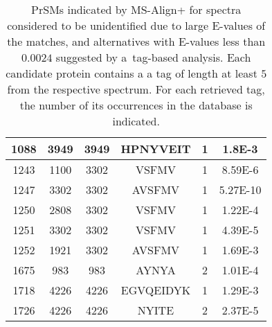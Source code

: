 \documentclass{article}[12pt]
\begin{document}
\begin{landscape}
\begin{table}[h]
{\begin{center}
\begin{tabular}{|c|c||c|c|c|c|}
  \hline
1088& 3949 & 
3949
 & 
HPNYVEIT & 1 & 1.8E-3\\
  \hline
1243& 1100 & 
3302
 & 
VSFMV & 1 & 8.59E-6\\
  \hline
1247& 3302 & 
3302
 & 
AVSFMV & 1 & 5.27E-10\\
  \hline
1250& 2808 & 
3302
 & 
VSFMV & 1 & 1.22E-4\\
  \hline
1251& 3302 & 
3302
 & 
VSFMV & 1 & 4.39E-5\\
  \hline
1252& 1921 & 
3302
 & 
AVSFMV & 1 & 1.69E-3\\
  \hline
1675& 983 & 
983
 & 
AYNYA & 2 & 1.01E-4\\
  \hline
1718& 4226 & 
4226
 & 
EGVQEIDYK & 1 & 1.29E-3\\
  \hline
1726& 4226 & 
4226
 & 
NYITE & 2 & 2.37E-5\\
\hline\end{tabular}
\end{center}
\par}
\centering
\caption{PrSMs indicated by MS-Align+ for spectra considered to be unidentified due to large E-values of the matches, and alternatives with E-values less than $0.0024$ suggested by a~tag-based analysis. Each candidate protein contains a a tag of length at least $5$ from the respective spectrum. For each retrieved tag, the number of its occurrences in the database is indicated.}
\vspace{3mm}
\label{table:unident-spectra}
\end{table}






\end{landscape}
\end{document}
